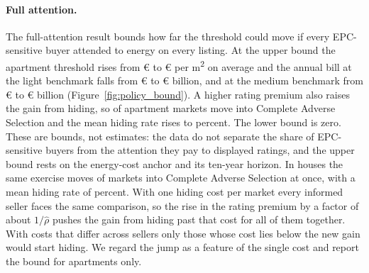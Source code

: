 \paragraph{Full attention.}
The full-attention result bounds how far the threshold could move if every EPC-sensitive buyer attended to energy on every listing. At the upper bound the apartment threshold rises from \euro{}\attScBaseRbarApt{} to \euro{}\attScHiRbarApt{} per m\textsuperscript{2} on average and the annual bill at the light benchmark falls from \euro{}\attScBaseCostTwoFiftyApt{} to \euro{}\attScHiCostTwoFiftyApt{} billion, and at the medium benchmark from \euro{}\attScBaseCostFiveHundredApt{} to \euro{}\attScHiCostFiveHundredApt{} billion (Figure~\ref{fig:policy_bound}). A higher rating premium also raises the gain from hiding, so \attScHiNCasApt{} of \attNMarketsApt{} apartment markets move into Complete Adverse Selection and the mean hiding rate rises to \attScHiSigmaApt{} percent. The lower bound is zero. These are bounds, not estimates: the data do not separate the share of EPC-sensitive buyers from the attention they pay to displayed ratings, and the upper bound rests on the energy-cost anchor and its ten-year horizon. In houses the same exercise moves \attScHiNCasHouse{} of \attNMarketsHouse{} markets into Complete Adverse Selection at once, with a mean hiding rate of \attScHiSigmaHouse{} percent. With one hiding cost per market every informed seller faces the same comparison, so the rise in the rating premium by a factor of about $1/\hat\rho$ pushes the gain from hiding past that cost for all of them together. With costs that differ across sellers only those whose cost lies below the new gain would start hiding. We regard the jump as a feature of the single cost and report the bound for apartments only.
